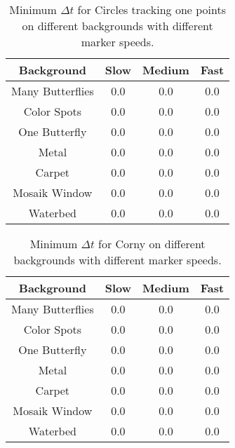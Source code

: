 \begin{table}[H]
\center
\begin{tabular}{|c|c|c|c|}
\hline
Background & Slow & Medium & Fast \\ \hline
Many Butterflies & 0.0 & 0.0 & 0.0 \\ \hline
Color Spots & 0.0 & 0.0 & 0.0 \\ \hline
One Butterfly & 0.0 & 0.0 & 0.0 \\ \hline
Metal & 0.0 & 0.0 & 0.0 \\ \hline
Carpet & 0.0 & 0.0 & 0.0 \\ \hline
Mosaik Window & 0.0 & 0.0 & 0.0 \\ \hline
Waterbed & 0.0 & 0.0 & 0.0 \\ \hline
\end{tabular}
\caption{Minimum $\Delta t$ for Circles tracking one points on different backgrounds with different marker speeds.}
\end{table}


\begin{table}[H]
\center
\begin{tabular}{|c|c|c|c|}
\hline
Background & Slow & Medium & Fast \\ \hline
Many Butterflies & 0.0 & 0.0 & 0.0 \\ \hline
Color Spots & 0.0 & 0.0 & 0.0 \\ \hline
One Butterfly & 0.0 & 0.0 & 0.0 \\ \hline
Metal & 0.0 & 0.0 & 0.0 \\ \hline
Carpet & 0.0 & 0.0 & 0.0 \\ \hline
Mosaik Window & 0.0 & 0.0 & 0.0 \\ \hline
Waterbed & 0.0 & 0.0 & 0.0 \\ \hline
\end{tabular}
\caption{Minimum $\Delta t$ for Corny on different backgrounds with different marker speeds.}
\end{table}






